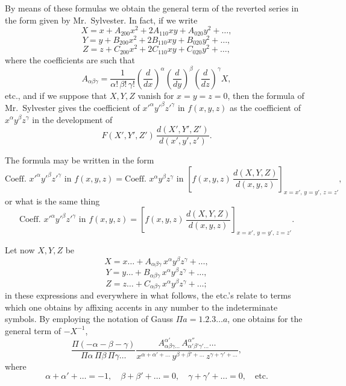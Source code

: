\documentclass[11pt,a4paper]{article}
\begin{document}
\setcounter{page}{58}

By means of these formulas we obtain the general term of the reverted series in the form given by Mr.~Sylvester. In fact, if we write
\[
X = x + A_{200}x^2 + 2A_{110}xy + A_{020}y^2 + \ldots,
\]
\[
Y = y + B_{200}x^2 + 2B_{110}xy + B_{020}y^2 + \ldots,
\]
\[
Z = z + C_{200}x^2 + 2C_{110}xy + C_{020}y^2 + \ldots,
\]
where the coefficients are such that
\[
A_{\alpha\beta\gamma} = \frac{1}{\alpha!\,\beta!\,\gamma!}
\left(\frac{d}{dx}\right)^\alpha
\left(\frac{d}{dy}\right)^\beta
\left(\frac{d}{dz}\right)^\gamma X,
\]
etc., and if we suppose that $X,Y,Z$ vanish for $x=y=z=0$, then the formula of Mr.~Sylvester gives the coefficient of $x'^\alpha y'^\beta z'^\gamma$ in $f(x,y,z)$ as the coefficient of $x^\alpha y^\beta z^\gamma$ in the development of
\[
F(X',Y',Z')\,\frac{d(X',Y',Z')}{d(x',y',z')}.
\]

The formula may be written in the form
\[
\text{Coeff. } x'^\alpha y'^\beta z'^\gamma \text{ in } f(x,y,z)
= \text{Coeff. } x^\alpha y^\beta z^\gamma \text{ in }
\left[ f(x,y,z)\,\frac{d(X,Y,Z)}{d(x,y,z)} \right]_{x=x',\,y=y',\,z=z'},
\]
or what is the same thing
\[
\text{Coeff. } x'^\alpha y'^\beta z'^\gamma \text{ in } f(x,y,z)
= \left[ f(x,y,z)\,\frac{d(X,Y,Z)}{d(x,y,z)} \right]_{x=x',\,y=y',\,z=z'}.
\]

\setcounter{page}{59}

Let now $X,Y,Z$ be
\[
X = x\ldots + A_{\alpha\beta\gamma}\,x^\alpha y^\beta z^\gamma + \ldots,
\]
\[
Y = y\ldots + B_{\alpha\beta\gamma}\,x^\alpha y^\beta z^\gamma + \ldots,
\]
\[
Z = z\ldots + C_{\alpha\beta\gamma}\,x^\alpha y^\beta z^\gamma + \ldots;
\]
in these expressions and everywhere in what follows, the etc.'s relate to terms which one obtains by affixing accents in any number to the indeterminate symbols. By employing the notation of Gauss $\Pi a = 1.2.3\ldots a$, one obtains for the general term of $-X^{-1}$,
\[
\frac{\Pi(-\alpha-\beta-\gamma)}{\Pi\alpha\,\Pi\beta\,\Pi\gamma\ldots}
\frac{A_{\alpha\beta\gamma\ldots}^{\alpha'}\,A_{\alpha'\beta'\gamma'\ldots}^{\alpha''}\ldots}
{x^{\alpha+\alpha'+\ldots}\,y^{\beta+\beta'+\ldots}\,z^{\gamma+\gamma'+\ldots}},
\]
where
\[
\alpha + \alpha' + \ldots = -1, \quad
\beta + \beta' + \ldots = 0, \quad
\gamma + \gamma' + \ldots = 0, \quad \text{etc.}
\]

\setcounter{page}{60}
\end{document}
